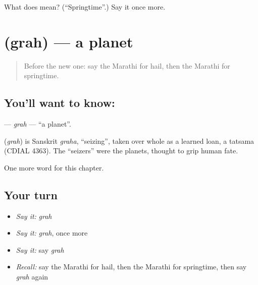 \begin{tcolorbox}[breakable,colback=teal!4,colframe=teal!35!black,title={Before you move on}]
What does  mean? (\textquotedblleft{}Springtime\textquotedblright{}.) Say it once more.
\end{tcolorbox}
\section[\texorpdfstring{\mr{ग्रह} (grah)}{ग्रह (grah)}]{ (grah) — a planet}

\label{lesson:MR-C246-grah}



\begin{quote}
Before the new one: say the Marathi for hail, then the Marathi for springtime.
\end{quote}

\subsection*{You'll want to know: }
\textbf{} — \emph{grah} — \textquotedblleft{}a planet\textquotedblright{}.

\begin{cousinweb}
\textbf{} (\emph{grah}) is Sanskrit \emph{graha}, \textquotedblleft{}seizing\textquotedblright{}, taken over whole as a learned loan, a tatsama (CDIAL 4363). The \textquotedblleft{}seizers\textquotedblright{} were the planets, thought to grip human fate.
\end{cousinweb}

\begin{grammarlens}[title={What you've built}]
One more word for this chapter.
\end{grammarlens}

\subsection*{Your turn}
\begin{itemize}
\raggedright
  \item \emph{Say it:} \emph{grah}
  \item \emph{Say it:} \emph{grah}, once more
  \item \emph{Say it:} say \emph{grah}
  \item \emph{Recall:} say the Marathi for hail, then the Marathi for springtime, then say \emph{grah} again
\end{itemize}

